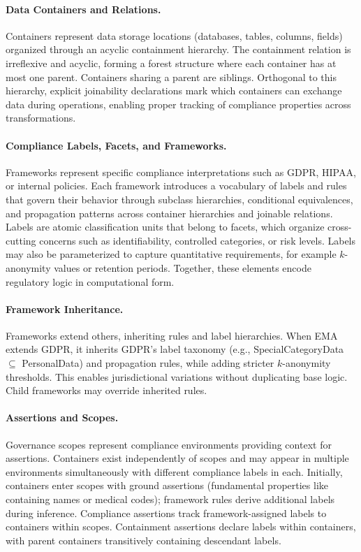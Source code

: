 \documentclass[runningheads,oneside]{llncs}
\begin{document}
\paragraph{Data Containers and Relations.}
Containers represent data storage locations (databases, tables, columns, fields) organized through an acyclic containment hierarchy. The containment relation is irreflexive and acyclic, forming a forest structure where each container has at most one parent. Containers sharing a parent are siblings. Orthogonal to this hierarchy, explicit joinability declarations mark which containers can exchange data during operations, enabling proper tracking of compliance properties across transformations.

\paragraph{Compliance Labels, Facets, and Frameworks.}
Frameworks represent specific compliance interpretations such as GDPR, HIPAA, or internal policies. Each framework introduces a vocabulary of labels and rules that govern their behavior through subclass hierarchies, conditional equivalences, and propagation patterns across container hierarchies and joinable relations. Labels are atomic classification units that belong to facets, which organize cross-cutting concerns such as identifiability, controlled categories, or risk levels. Labels may also be parameterized to capture quantitative requirements, for example $k$-anonymity values or retention periods. Together, these elements encode regulatory logic in computational form.

\paragraph{Framework Inheritance.}
Frameworks extend others, inheriting rules and label hierarchies. When EMA extends GDPR, it inherits GDPR's label taxonomy (e.g., SpecialCategoryData $\subseteq$ PersonalData) and propagation rules, while adding stricter $k$-anonymity thresholds. This enables jurisdictional variations without duplicating base logic. Child frameworks may override inherited rules.

\paragraph{Assertions and Scopes.}
Governance scopes represent compliance environments providing context for assertions. Containers exist independently of scopes and may appear in multiple environments simultaneously with different compliance labels in each. Initially, containers enter scopes with ground assertions (fundamental properties like containing names or medical codes); framework rules derive additional labels during inference. Compliance assertions track framework-assigned labels to containers within scopes. Containment assertions declare labels within containers, with parent containers transitively containing descendant labels.
\end{document}
